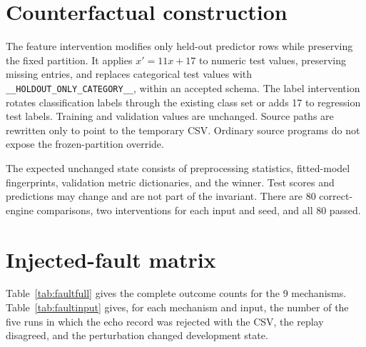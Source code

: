 \documentclass[11pt,letterpaper]{article}
\begin{document}
\section{Counterfactual construction}
The feature intervention modifies only held-out predictor rows while preserving the fixed partition. It applies $x' = 11x+17$ to numeric test values, preserving missing entries, and replaces categorical test values with \texttt{\_\_HOLDOUT\_ONLY\_CATEGORY\_\_}, within an accepted schema. The label intervention rotates classification labels through the existing class set or adds 17 to regression test labels. Training and validation values are unchanged. Source paths are rewritten only to point to the temporary CSV. Ordinary source programs do not expose the frozen-partition override.

The expected unchanged state consists of preprocessing statistics, fitted-model fingerprints, validation metric dictionaries, and the winner. Test scores and predictions may change and are not part of the invariant. There are 80 correct-engine comparisons, two interventions for each input and seed, and all 80 passed.

\section{Injected-fault matrix}
Table~\ref{tab:faultfull} gives the complete outcome counts for the 9 mechanisms. Table~\ref{tab:faultinput} gives, for each mechanism and input, the number of the five runs in which the echo record was rejected with the CSV, the replay disagreed, and the perturbation changed development state.
\end{document}

